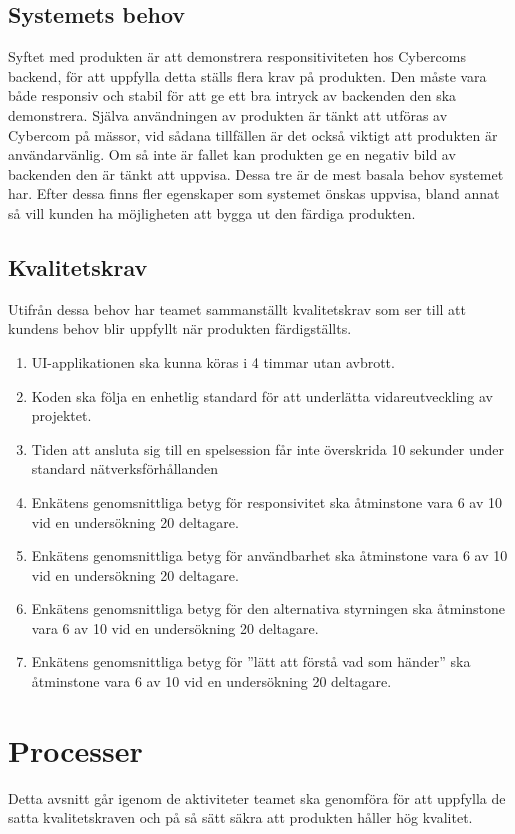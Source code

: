 \documentclass[10pt]{article}
\begin{document}
	\subsection{Systemets behov}
	Syftet med produkten är att demonstrera responsitiviteten hos Cybercoms backend, för att uppfylla detta ställs flera krav på produkten. Den måste vara både responsiv och stabil för att ge ett bra intryck av backenden den ska demonstrera. Själva användningen av produkten är tänkt att utföras av Cybercom på mässor, vid sådana tillfällen är det också viktigt att produkten är användarvänlig. Om så inte är fallet kan produkten ge en negativ bild av backenden den är tänkt att uppvisa. Dessa tre är de mest basala behov systemet har. Efter dessa finns fler egenskaper som systemet önskas uppvisa, bland annat så vill kunden ha möjligheten att bygga ut den färdiga produkten.
	
	
	\subsection{Kvalitetskrav}
	Utifrån dessa behov har teamet sammanställt kvalitetskrav som ser till att kundens behov blir uppfyllt när produkten färdigställts.
	\begin{enumerate}
		\item UI-applikationen ska kunna köras i 4 timmar utan avbrott.
		\item Koden ska följa en enhetlig standard för att underlätta vidareutveckling av projektet.
		\item Tiden att ansluta sig till en spelsession får inte överskrida 10 sekunder under standard nätverksförhållanden
		\item Enkätens genomsnittliga betyg för responsivitet ska åtminstone vara 6 av 10 vid en undersökning 20 deltagare.
		\item Enkätens genomsnittliga betyg för användbarhet ska åtminstone vara 6 av 10 vid en undersökning 20 deltagare.
		\item Enkätens genomsnittliga betyg för den alternativa styrningen ska åtminstone vara 6 av 10 vid en undersökning 20 deltagare.
		\item Enkätens genomsnittliga betyg för ''lätt att förstå vad som händer'' ska åtminstone vara 6 av 10 vid en undersökning 20 deltagare.
		
	\end{enumerate}

\pagebreak
\section{Processer}
	Detta avsnitt går igenom de aktiviteter teamet ska genomföra för att uppfylla de satta kvalitetskraven och på så sätt säkra att produkten håller hög kvalitet.
\end{document}
